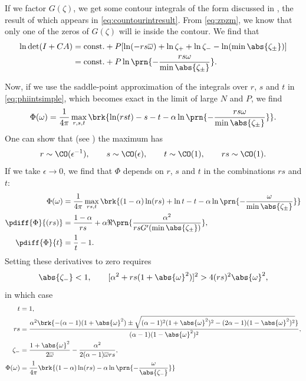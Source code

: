 \documentclass[12pt]{article}
\newcommand{\inv}{^{-1}}
\newcommand{\omb}{\overline{\omega}}
\begin{document}
If we factor $G(\zeta)$, we get some contour integrals of the form discussed in , the result of which appears in \eqref{eq:countourintresult}.
From \eqref{eq:zpzm}, we know that only one of the zeros of $G(\zeta)$ will ie inside the contour.
We find that
%
\begin{equation}\label{eq:detsimpleresult}
\begin{aligned}
  \ln\det(I+CA) &= \text{const.} + P[\ln(-rs\omb) + \ln\zeta_+ + \ln\zeta_- - \ln(\min\abs{\zeta_\pm})]   \\
   &= \text{const.} + P\ln\prn{-\frac{rs\omega}{\min\abs{\zeta_\pm}}}.
\end{aligned}
\end{equation}
%

Now, if we use the saddle-point approximation of the integrals over $r$, $s$ and $t$ in \eqref{eq:phiintsimple}, which becomes exact in the limit of large $N$ and $P$, we find
%
\begin{equation}\label{eq:phisaddlesimple}
  \Phi(\omega) = \frac{1}{4\pi} \max_{r,s,t} \brk{ \ln(rst) - s - t -\alpha\ln\prn{-\frac{rs\omega}{\min\abs{\zeta_\pm}}}}.
\end{equation}
%
One can show that (see ) the maximum has
%
\begin{equation}\label{eq:saddleOe}
  r \sim \CO(\epsilon\inv),
  \qquad
  s \sim \CO(\epsilon),
  \qquad
  t \sim \CO(1),
  \qquad
  rs \sim \CO(1).
\end{equation}
%
If we take $\epsilon\to0$, we find that $\Phi$ depends on $r$, $s$ and $t$ in the combinations $rs$ and $t$:
%
\begin{equation}\label{eq:phimaxsimple}
\begin{aligned}
  \Phi(\omega) &= \frac{1}{4\pi} \max_{rs,t} \brk{ (1-\alpha)\ln(rs)+\ln t - t -\alpha\ln\prn{-\frac{\omega}{\min\abs{\zeta_\pm}}}}\\
  \pdiff{\Phi}{(rs)} &= \frac{1-\alpha}{rs} + \alpha\Re\prn{\frac{\alpha^2}{rs G'(\min\abs{\zeta_\pm})}} ,\\
  \pdiff{\Phi}{t}&= \frac{1}{t} - 1 .
\end{aligned}
\end{equation}
%
Setting these derivatives to zero requires
%
\begin{equation}\label{eq:saddlereq}
  \abs{\zeta_-}<1,
  \qquad
  [\alpha^2+rs(1+\abs{\omega}^2)]^2 > 4(rs)^2\abs{\omega}^2,
\end{equation}
%
in which case
%
\begin{equation}\label{eq:saddlesol}
\begin{aligned}
  t &=1, \\
  rs &= \frac{\alpha^2 \brk{ -(\alpha-1)(1+\abs{\omega}^2) \pm \sqrt{ (\alpha-1)^2(1+\abs{\omega}^2)^2 - (2\alpha-1)(1-\abs{\omega}^2)^2 } }}{(\alpha-1)(1-\abs{\omega}^2)^2},\\
  \zeta_- &= \frac{1+\abs{\omega}^2}{2\omb} - \frac{\alpha^2}{2(\alpha-1)\omb rs},\\
 \Phi(\omega) &= \frac{1}{4\pi}\brk{ (1-\alpha)\ln(rs) -\alpha\ln\prn{-\frac{\omega}{\abs{\zeta_-}}}}
\end{aligned}
\end{equation}
\end{document}
